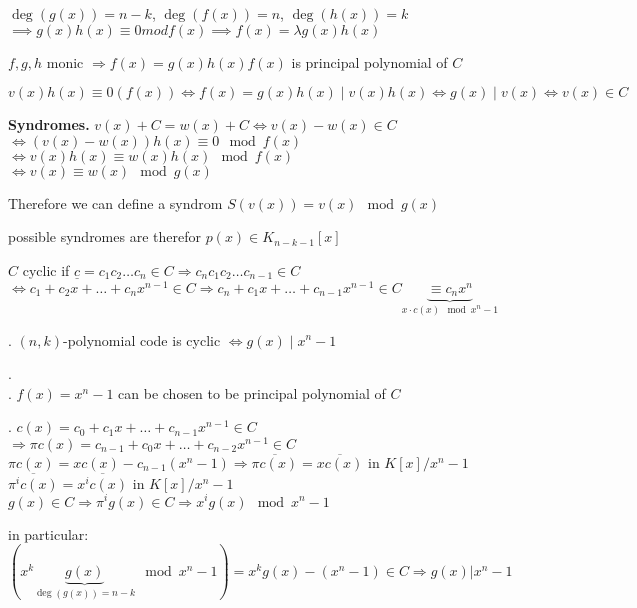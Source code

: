 $\deg(g(x)) = n-k$, $\deg(f(x)) = n$, $\deg(h(x)) = k$\\
$\implies g(x)h(x) \equiv 0 mod f(x) \implies f(x) = \lambda g(x)h(x)$

$f,g,h$ monic $\Rightarrow f(x) = g(x)h(x)$\quad$f(x)$ is principal polynomial of $C$

$v(x)h(x) \equiv 0 (f(x)) \Leftrightarrow f(x)=g(x)h(x) \mid v(x)h(x) \Leftrightarrow g(x) \mid v(x) \Leftrightarrow v(x)\in C $

\textbf{Syndromes.} 
$v(x)+C = w(x) + C \Leftrightarrow v(x) - w(x) \in C$\\
$\Leftrightarrow (v(x)-w(x))h(x) \equiv 0 \mod f(x)$\\
$\Leftrightarrow v(x)h(x) \equiv w(x)h(x) \mod f(x)$ \\
$\Leftrightarrow v(x) \equiv w(x) \mod g(x)$

Therefore we can define a syndrom $S(v(x)) = v(x) \mod g(x)$

possible syndromes are therefor $p(x) \in K_{n-k-1}[x]$

\begin{definition}
  $C$ cyclic if $ \underline{c} = c_1c_2\ldots c_n \in C \Rightarrow c_nc_1c_2\ldots c_{n-1} \in C$\\
  $\Leftrightarrow c_1 + c_2 x+ \ldots + c_n x^{n-1} \in C \Rightarrow c_n + c_1 x + \ldots + c_{n-1} x^{n-1} \in C \underbrace{\equiv c_n x^n}_{x\cdot c(x) \mod x^n-1}$
\end{definition}

\Theorem.
$(n,k)$-polynomial code is cyclic $\Leftrightarrow g(x) \mid x^n-1$

\Proof.\\
\ProofBackward.
$f(x) = x^n-1$ can be chosen to be principal polynomial of $C$

\ProofForward.
$c(x) = c_0 + c_1x + \ldots + c_{n-1}x^{n-1} \in C$\\
$\Rightarrow \pi c(x) = c_{n-1} + c_0x + \ldots + c_{n-2}x^{n-1} \in C$\\
$\pi c(x) = xc(x) - c_{n-1}(x^n-1) \Rightarrow \overline{\pi c(x)} = \overline{x c(x)}$ in $K[x]/x^n-1$\\
$\overline{\pi^i c(x)} = \overline{x^i c(x)}$ in $K[x]/x^n-1$\\

$g(x) \in C \Rightarrow \pi^i g(x) \in C \Rightarrow x^i g(x) \mod x^n -1$

in particular: $( x^k \underbrace{g(x)}_{\deg(g(x)) = n-k} \mod x^n -1 ) = x^k g(x) - (x^n-1) \in C \Rightarrow g(x)|x^n-1$

